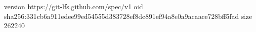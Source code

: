 version https://git-lfs.github.com/spec/v1
oid sha256:331cb6a911edee99ed54555d383728ef8dc891ef94a8e0a9acaace728bff5fad
size 262240
